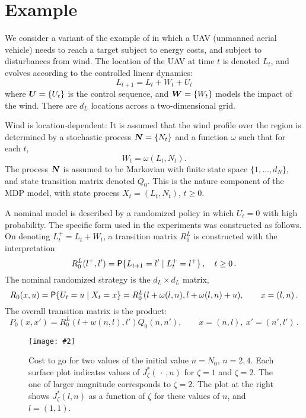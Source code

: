 \documentclass[final,12pt]{colt2018} %
\def\bfmath#1{{\mathchoice{\mbox{\boldmath$#1$}}%
{\mbox{\boldmath$#1$}}%
{\mbox{\boldmath$\scriptstyle#1$}}%
{\mbox{\boldmath$\scriptscriptstyle#1$}}}}
\def\bfmN{\bfmath{N}}
\def\bfmU{\bfmath{U}}
\def\bfmW{\bfmath{W}}
\def\Prob{{\sf P}}
\def\varble{\,\cdot\,}
\def\Ebox#1#2{%
\begin{center}
\texttt{[image: \#2]} \end{center}}
\begin{document}
\def\Ltarget{l^{\bullet}}

\def\stateL{{\sf X}^L}
\def\wind{\omega}




\section{Example} 
\label{s:drone}
 
We consider a variant of the example of  \cite{alsgonsmi13} in which a UAV 
(unmanned aerial vehicle) 
 needs to reach a target subject to energy costs, and subject to disturbances from wind.   The location of the UAV at time $t$ is denoted $L_t$, and evolves according to the controlled linear dynamics:
\begin{equation}
L_{t+1} = L_t + W_t + U_t  
\label{e:modelLnat}
\end{equation}
where $\bfmU=\{U_t\}$ is the control sequence, and  $\bfmW=\{W_t\}$  models the impact of the wind. There are $d_L$ locations across a two-dimensional grid. 

Wind is location-dependent: It is assumed that the  wind profile over the region is determined by a stochastic process $\bfmN =\{ N_t\} $ and a function $\wind$ such that for each $t$,
\[
W_t=\wind(L_t, N_t ).
\]
The process $\bfmN$  is assumed to be Markovian with finite state space $  \{1,\dots,d_N\}$, and state transition matrix denoted $Q_0$.  This is the
 nature component of the MDP model,  with state process $X_t=(L_t,N_t)$,  $t\ge 0$.

A nominal model is described by a randomized policy in which $U_t=0$ with high probability.   The specific form used in the experiments %
was constructed as follows.   On denoting  $  L^+_t = L_t + W_t$, a transition matrix $R_0^L$ is constructed with the interpretation
\[
R_0^L(l^+, l')  = \Prob\{ L_{t+1} =  l' \mid L^+_t  = l^+ \}\,,\quad t\ge 0\, .
\]
The nominal randomized strategy is the $d_L\times d_L$ matrix,
\[
R_0(x, u)  = \Prob\{ U_t = u\mid X_t  = x \} = R_0^L(l+\wind(l,n) , l+\wind(l,n)+u ) ,   \qquad x=(l,n)\, .
\]
The overall transition matrix is the product:
\[
P_0(x,x') = R_0^L(l+w(n,l), l') Q_0(n,n'),\qquad x=(n,l),\ x'=(n',l')\, .
\]


 \begin{figure}[h]
\Ebox{.9}{CostToGo15x15n2n4+Siberia.pdf} 
\vspace{-3.5ex}
\caption{\small Cost to go for two values of the initial value $n=N_0$,  $n =2,4$.   Each surface plot indicates values of $J^*_\zeta(\varble,n)$ for $\zeta=1$ and $\zeta=2$.  The one of larger magnitude corresponds to $\zeta=2$.    The plot at the right shows $J^*_\zeta(l,n)$ as a function of $\zeta$ for these values of $n$,  and $l=(1,1)$. }
\label{f:CostToGo15x15n2n4}
\vspace{-1.5ex}
\end{figure} 
\end{document}
